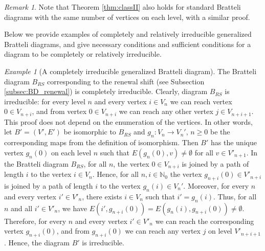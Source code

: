 \documentclass[11pt, twoside]{amsart}
\theoremstyle{definition}
\theoremstyle{remark}
\newtheorem{example}[definition]{Example}
\newtheorem{remark}[definition]{Remark}
\theoremstyle{plain}
\newtheorem{prop}[definition]{Proposition}
\newcommand{\tcr}{\textcolor{red}}
\newcommand{\N}{\mathbb N}
\numberwithin{equation}{section}
\begin{document}
\begin{remark}
Note that Theorem \ref{thm:classII} also holds for standard Bratteli diagrams with the same number of vertices on each level, with a similar proof.
\end{remark}



Below we provide examples of completely and relatively irreducible generalized Bratteli diagrams, and give necessary conditions and sufficient conditions for a diagram to be completely or relatively irreducible.

\begin{example}[A completely irreducible generalized Bratteli diagram]\label{ex:GBDclass1} The Bratteli diagram $B_{RS}$ corresponding to the renewal shift (see Subsection \ref{subsec:BD_renewal}) is completely irreducible. Clearly, diagram $B_{RS}$ is irreducible: for every level $n$ and every vertex $i \in V_n$ we can reach vertex $0 \in V_{n+i}$, and from vertex $0  \in V_{n+i}$ we can reach any other vertex $j \in V_{n + i + 1}$. This proof does not depend on the enumeration of the vertices. In other words, let $B'=(V',E')$ be isomorphic to $B_{RS}$ and $g_n \colon V_n \rightarrow V_n'$, $n \geq 0$ be the corresponding maps from the definition of isomorphism. Then $B'$ has the unique vertex $g_n(0)$ on each level $n$ such that $E(g_n(0),v) \neq \emptyset$ for all $v \in V'_{n+1}$. In the Bratteli diagram $B_{RS}$, for all $n$, the vertex $0 \in V_{n+i}$ is joined by a path of length $i$ to the vertex $i \in V_n$. Hence, for all $n, i \in \N_0$ the vertex $g_{n+i}(0) \in V'_{n+i}$ is joined by a path of length $i$ to the vertex $g_n(i) \in V_n'$. 
Moreover, for every $n$ and every vertex  $i' \in V'_n$, there exists $i \in V_n$ such that $i' = g_n(i)$. Thus, for all $n$ and all $i' \in V'_n$, we have $E(i', g_{n+i}(0)) = E(g_n(i), g_{n+i}(0)) \neq \emptyset$. Therefore, for every $n$ and every vertex $i'\in V'_n$ we can reach the corresponding vertex $g_{n+i}(0)$, and from $g_{n+i}(0)$ we can reach any vertex $j$ on level $V'_{n+i+1}$. Hence, the diagram $B'$ is irreducible.
\end{example}

\end{document}
